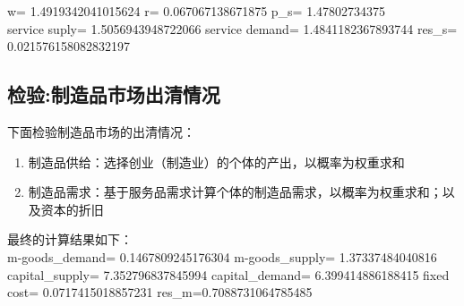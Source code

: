 \documentclass[a4paper, 12pt]{ctexart}
\begin{document}
w= 1.4919342041015624 r= 0.067067138671875 p\_s= 1.47802734375 \\service suply= 1.5056943948722066 service demand= 1.4841182367893744 res\_s= 0.021576158082832197

\subsection{检验:制造品市场出清情况}
下面检验制造品市场的出清情况：
\begin{enumerate}
    \item 制造品供给：选择创业（制造业）的个体的产出，以概率为权重求和
    \item 制造品需求：基于服务品需求计算个体的制造品需求，以概率为权重求和；以及资本的折旧
\end{enumerate}
最终的计算结果如下：
\\ m-goods\_demand= 0.1467809245176304 m-goods\_supply= 1.37337484040816 capital\_supply= 7.352796837845994 capital\_demand= 6.399414886188415 fixed cost= 0.0717415018857231 res\_m=0.7088731064785485
\end{document}
